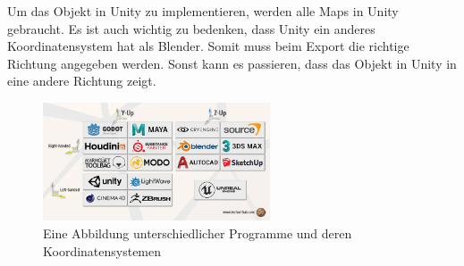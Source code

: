 Um das Objekt in Unity zu implementieren, werden alle Maps in Unity gebraucht. Es ist auch wichtig zu bedenken, dass Unity ein anderes Koordinatensystem hat als Blender. Somit muss beim Export die richtige Richtung angegeben werden. Sonst kann es passieren, dass das Objekt in Unity in eine andere Richtung zeigt.

\begin{figure}[H]
    \centering
    \includegraphics[width=0.6\textwidth]{chapters/11/Images/Koordinaten.png}
    \caption{Eine Abbildung unterschiedlicher Programme und deren Koordinatensystemen}
    \label{htl01}
\end{figure}

\pagebreak